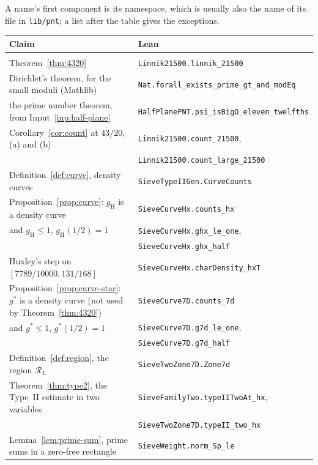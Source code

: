\documentclass[11pt]{article}
\theoremstyle{definition}
\newcommand{\lean}[1]{\texttt{#1}}
\newcommand{\file}[1]{\nolinkurl{#1}}
\begin{document}
A name's first component is its namespace, which is usually also the name of its file in \file{lib/pnt}; a list
after the table gives the exceptions.

{\footnotesize
\begin{longtable}{@{}>{\raggedright\arraybackslash}p{}l@{}}
\toprule
Claim & Lean \\
\midrule
\endhead
\multicolumn{2}{@{}l}{\emph{Theorem~\ref{thm:4320} and Sections~\ref{sec:inputs} to~\ref{sec:proof}}} \\
Theorem~\ref{thm:4320} & \lean{Linnik21500.linnik\_21500} \\
\quad Dirichlet's theorem, for the small moduli (Mathlib) & \lean{Nat.forall\_exists\_prime\_gt\_and\_modEq} \\
\quad the prime number theorem, from Input~\ref{inp:half-plane} & \lean{HalfPlanePNT.psi\_isBigO\_eleven\_twelfths} \\
Corollary~\ref{cor:count} at $43/20$, (a) and (b) & \lean{Linnik21500.count\_21500}, \\
 & \lean{Linnik21500.count\_large\_21500} \\
Definition~\ref{def:curve}, density curves & \lean{SieveTypeIIGen.CurveCounts} \\
Proposition~\ref{prop:curve}: $g_{\mathrm H}$ is a density curve & \lean{SieveCurveHx.counts\_hx} \\
\quad and $g_{\mathrm H} \le 1$, $g_{\mathrm H}(1/2) = 1$ & \lean{SieveCurveHx.ghx\_le\_one}, \\
 & \lean{SieveCurveHx.ghx\_half} \\
\quad Huxley's step on $[7789/10000, 131/168]$ & \lean{SieveCurveHx.charDensity\_hxT} \\
Proposition~\ref{prop:curve-star}: $g^*$ is a density curve (not used by Theorem~\ref{thm:4320}) &
\lean{SieveCurve7D.counts\_7d} \\
\quad and $g^* \le 1$, $g^*(1/2) = 1$ & \lean{SieveCurve7D.g7d\_le\_one}, \\
 & \lean{SieveCurve7D.g7d\_half} \\
Definition~\ref{def:region}, the region $\mathcal R_L$ & \lean{SieveTwoZone7D.Zone7d} \\
Theorem~\ref{thm:type2}, the Type~II estimate in two variables & \lean{SieveFamilyTwo.typeIITwoAt\_hx}, \\
 & \lean{SieveTwoZone7D.typeII\_two\_hx} \\
Lemma~\ref{lem:prime-sum}, prime sums in a zero-free rectangle & \lean{SieveWeight.norm\_Sp\_le} \\

\end{longtable}}
\end{document}
